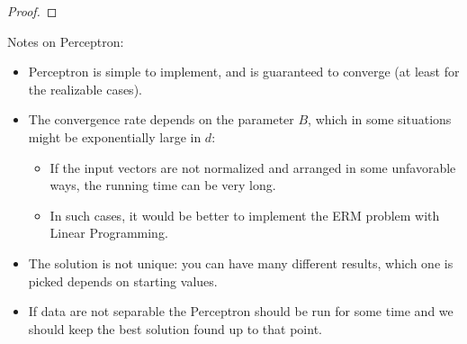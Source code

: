 \documentclass[12pt]{report}
\theoremstyle{plain}
\begin{document}
\begin{flushleft}
\begin{proof}
\end{proof}
Notes on Perceptron:
\begin{itemize}
	\item Perceptron is simple to implement, and is guaranteed to converge (at 
	least for the realizable cases).
	\item The convergence rate depends on the parameter $B$, which in some 
	situations might be exponentially large in $d$:
	\begin{itemize}
		\item If the input vectors are not normalized and arranged in some 
		unfavorable ways, the running time can be very long.
		\item In such cases, it would be better to implement the ERM problem 
		with Linear Programming.
	\end{itemize}
	\item The solution is not unique: you can have many different results, 
	which one is picked depends on starting values.
	\item If data are not separable the Perceptron should be run for some time 
	and we should keep the best solution found up to that point.
\end{itemize}



\end{flushleft}
\end{document}
